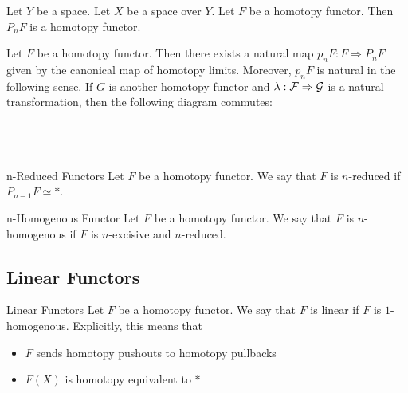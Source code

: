 \documentclass[a4paper]{article}
\begin{document}
\begin{lmm}{}{} Let $Y$ be a space. Let $X$ be a space over $Y$. Let $F$ be a homotopy functor. Then $P_nF$ is a homotopy functor.   
\end{lmm}

\begin{prp}{}{} Let $F$ be a homotopy functor. Then there exists a natural map $p_nF:F\Rightarrow P_nF$ given by the canonical map of homotopy limits. Moreover, $p_nF$ is natural in the following sense. If $G$ is another homotopy functor and $\lambda:\mathcal{F}\Rightarrow\mathcal{G}$ is a natural transformation, then the following diagram commutes: \\~\\
\\~\\
\end{prp}

\begin{defn}{n-Reduced Functors}{} Let $F$ be a homotopy functor. We say that $F$ is $n$-reduced if $P_{n-1}F\simeq\ast$. 
\end{defn}

\begin{defn}{n-Homogenous Functor}{} Let $F$ be a homotopy functor. We say that $F$ is $n$-homogenous if $F$ is $n$-excisive and $n$-reduced. 
\end{defn}

\subsection{Linear Functors}
\begin{defn}{Linear Functors}{} Let $F$ be a homotopy functor. We say that $F$ is linear if $F$ is $1$-homogenous. Explicitly, this means that 
\begin{itemize}
\item $F$ sends homotopy pushouts to homotopy pullbacks
\item $F(X)$ is homotopy equivalent to $\ast$
\end{itemize}
\end{defn}
\end{document}
